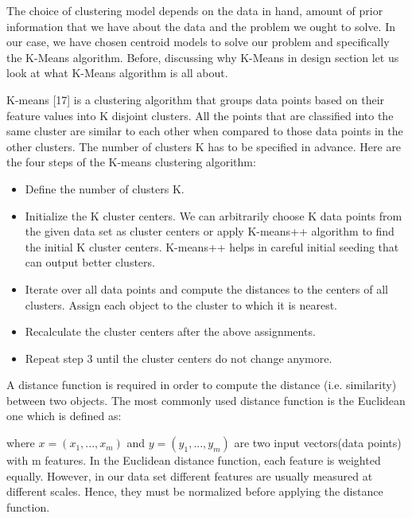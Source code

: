 The choice of clustering model depends on the data in hand, amount of prior information that we have about the data and the problem we ought to solve. In our case, we have chosen centroid models to solve our problem and specifically the K-Means algorithm. Before, discussing why K-Means in design section let us look at what K-Means algorithm is all about.

K-means [17] is a clustering algorithm that groups data points based on their feature values into K disjoint clusters. All the points that are classified into the same cluster are similar to each other when compared to those data points in the other clusters. The number of clusters K has to be specified in advance. Here are the four steps of the K-means clustering
algorithm:

\begin{itemize}
	\item Define the number of clusters K.
	
	\item Initialize the K cluster centers. We can arbitrarily choose K data points from the given data set as cluster centers or apply K-means++ \cite{arthur2007k} algorithm to find the initial K cluster centers. K-means++ helps in careful initial seeding that can output better clusters.
	
	\item Iterate over all data points and compute the distances to the centers of all clusters. Assign each object to the cluster to which it is nearest.
	
	\item Recalculate the cluster centers after the above assignments.
	
	\item Repeat step 3 until the cluster centers do not change anymore.
\end{itemize}

A distance function is required in order to compute the
distance (i.e. similarity) between two objects. The most commonly used distance function is the Euclidean one which is defined as:

\begin{center}
\end{center}
where $x = (x_1, ..., x_m)$ and $y = (y_1, ..., y_m)$ are two input vectors(data points) with m features. In the Euclidean distance function, each feature is weighted equally. However, in our data set different features are usually measured at different scales. Hence, they must be normalized before applying the distance function.